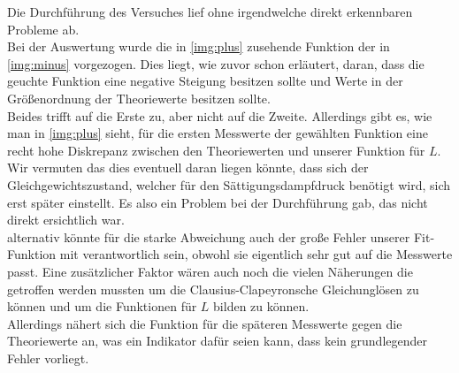 Die Durchführung des Versuches lief ohne irgendwelche direkt erkennbaren Probleme ab.\\
Bei der Auswertung wurde die in \ref{img:plus} zusehende Funktion der in \ref{img:minus} vorgezogen.
Dies liegt, wie zuvor schon erläutert, daran, dass die geuchte Funktion eine negative Steigung besitzen sollte und Werte in der Größenordnung der Theoriewerte besitzen sollte.\\
Beides trifft auf die Erste zu, aber nicht auf die Zweite.
Allerdings gibt es, wie man in \ref{img:plus} sieht, für die ersten Messwerte der gewählten Funktion eine recht hohe Diskrepanz zwischen den Theoriewerten und unserer Funktion für $L$.
Wir vermuten das dies eventuell daran liegen könnte, dass sich der Gleichgewichtszustand, welcher für den Sättigungsdampfdruck benötigt wird, sich erst später einstellt.
Es also ein Problem bei der Durchführung gab, das nicht direkt ersichtlich war.\\
alternativ könnte für die starke Abweichung auch der große Fehler unserer Fit-Funktion mit verantwortlich sein, obwohl sie eigentlich sehr gut auf 
die Messwerte passt. Eine zusätzlicher Faktor wären auch noch die vielen Näherungen die getroffen werden mussten um die Clausius-Clapeyronsche Gleichunglösen zu können
und um die Funktionen für $L$ bilden zu können.\\
Allerdings nähert sich die Funktion für die späteren Messwerte gegen die Theoriewerte an, was ein Indikator dafür seien kann, dass kein grundlegender Fehler vorliegt.\\

